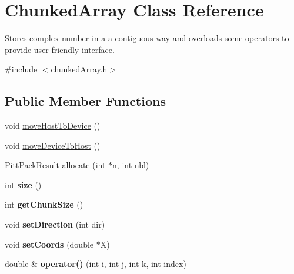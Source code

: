 \hypertarget{classChunkedArray}{}\section{Chunked\+Array Class Reference}
\label{classChunkedArray}


Stores complex number in a a contiguous way and overloads some operators to provide user-\/friendly interface.  




{\ttfamily \#include $<$chunked\+Array.\+h$>$}

\subsection*{Public Member Functions}
\begin{DoxyCompactItemize}
\item 
void \mbox{\hyperlink{classChunkedArray_a1ae58bbd5d8e5e628c43f1fc0c222427}{move\+Host\+To\+Device}} ()
\item 
void \mbox{\hyperlink{classChunkedArray_a06ea03d909d7072852e92bd159a6c719}{move\+Device\+To\+Host}} ()
\item 
Pitt\+Pack\+Result \mbox{\hyperlink{classChunkedArray_a61a06ae961bb5d45fe6a7268fe276ac3}{allocate}} (int $\ast$n, int nbl)
\item 
\mbox{\label{classChunkedArray_a5b768db5d280d532e090e871b6297fc1}} 
int {\bfseries size} ()
\item 
\mbox{\label{classChunkedArray_a62f4acf8950745e13122cce62ed06ee3}} 
int {\bfseries get\+Chunk\+Size} ()
\item 
\mbox{\label{classChunkedArray_ac7cafd1fd98f3256217c82887696ef99}} 
void {\bfseries set\+Direction} (int dir)
\item 
\mbox{\label{classChunkedArray_ac34d626f2e0f3a39381287e14b75ef74}} 
void {\bfseries set\+Coords} (double $\ast$X)
\item 
\mbox{\label{classChunkedArray_aa245e2b758286956ce8986c75dd2bacb}} 
double \& {\bfseries operator()} (int i, int j, int k, int index)
\item 
\mbox{\label{classChunkedArray_a2b34add05354d1cd850bd4dc43021c65}} 

\end{DoxyCompactItemize}
